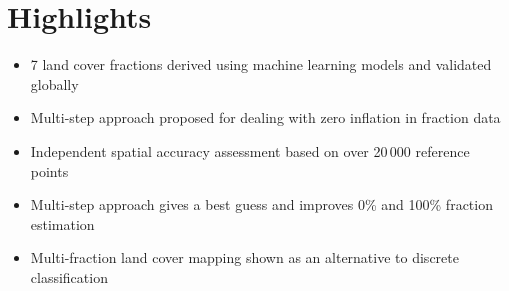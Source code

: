 \documentclass[review,authoryear,3p]{elsarticle}
\begin{document}
\section*{Highlights}
\begin{itemize}
    \item 7 land cover fractions derived using machine learning models and validated globally
    \item Multi-step approach proposed for dealing with zero inflation in fraction data
    \item Independent spatial accuracy assessment based on over 20\,000 reference points
    \item Multi-step approach gives a best guess and improves 0\% and 100\% fraction estimation
    \item Multi-fraction land cover mapping shown as an alternative to discrete classification
\end{itemize}
\end{document}
